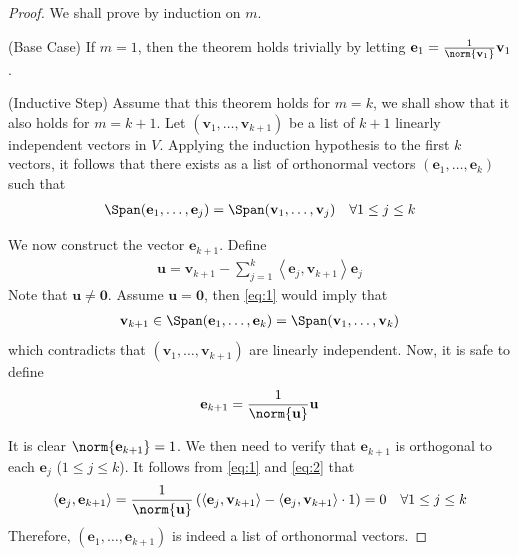 \documentclass[thmcnt=section, color=blue, 12pt]{my-elegantbook}
\begin{document}
\begin{proof}
    We shall prove by induction on $m$. 

    \par(Base Case) If $m = 1$, then the theorem holds trivially by letting $\mathbf{e}_1 = \frac{1}{\norm{\mathbf{v}_1}} \mathbf{v}_1$.

    \par(Inductive Step) Assume that this theorem holds for $m = k$, we shall show that it also holds for $m = k+1$. Let $(\mathbf{v}_1, \ldots, \mathbf{v}_{k+1})$ be a list of $k+1$ linearly independent vectors in $V$. Applying the induction hypothesis to the first $k$ vectors, it follows that there exists as a list of orthonormal vectors $(\mathbf{e}_1, \ldots, \mathbf{e}_k)$ such that 
    \begin{align}
        \Span(\mathbf{e}_1, \ldots, \mathbf{e}_j)
        = \Span(\mathbf{v}_1, \ldots, \mathbf{v}_j)
        \quad \forall 1 \leq j \leq k
        \label{eq:4}
    \end{align}

    \par We now construct the vector $\mathbf{e}_{k+1}$. Define 
    \begin{align}
        \mathbf{u} = \mathbf{v}_{k+1} - \sum_{j=1}^k \left\langle \mathbf{e}_j, \mathbf{v}_{k+1} \right\rangle \mathbf{e}_j
        \label{eq:1}
    \end{align}
    Note that $\mathbf{u} \neq \mathbf{0}$. Assume $\mathbf{u} = \mathbf{0}$, then \eqref{eq:1} would imply that
    \begin{align*}
        \mathbf{v}_{k+1} \in \Span(\mathbf{e}_1, \ldots, \mathbf{e}_k)
        = \Span(\mathbf{v}_1, \ldots, \mathbf{v}_k)
    \end{align*}
    which contradicts that $(\mathbf{v}_1, \ldots, \mathbf{v}_{k+1})$ are linearly independent. Now, it is safe to define 
    \begin{align}
        \mathbf{e}_{k+1} = \frac{1}{\norm{\mathbf{u}}} \mathbf{u}
        \label{eq:2}
    \end{align}

    \par It is clear $\norm{\mathbf{e}_{k+1}} = 1$. We then need to verify that $\mathbf{e}_{k+1}$ is orthogonal to each $\mathbf{e}_j$ ($1 \leq j \leq k$). It follows from \eqref{eq:1} and \eqref{eq:2} that 
    \begin{align*}
        \left\langle \mathbf{e}_j, \mathbf{e}_{k+1} \right\rangle
        = \frac{1}{\norm{\mathbf{u}}} \left(
            \left\langle \mathbf{e}_j, \mathbf{v}_{k+1} \right\rangle
            - \left\langle  \mathbf{e}_j, \mathbf{v}_{k+1} \right\rangle \cdot 1
        \right)
        = 0
        \quad \forall 1 \leq j \leq k
    \end{align*}
    Therefore, $(\mathbf{e}_1, \ldots, \mathbf{e}_{k+1})$ is indeed a list of orthonormal vectors.


\end{proof}
\end{document}
